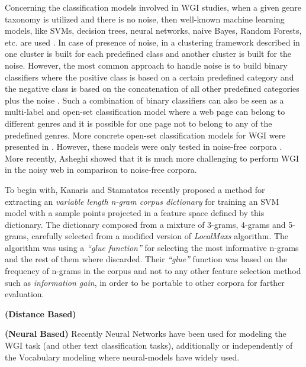 Concerning the classification models involved in WGI studies, when a given genre taxonomy is utilized and there is no noise, then well-known machine learning models, like SVMs, decision trees, neural networks, naive Bayes, Random Forests, etc. are used \parencite{Lim2005,santini2007automatic,kanaris2009learning,jebari2015combination,sharoff2010web}. In case of presence of  noise, in a clustering framework described in \parencite{kennedy2005automatic} one cluster is built for each predefined class and another cluster is built for the noise. However, the most  common approach to handle noise is to build binary classifiers where the positive class is based on a certain predefined category and the negative class is based on the concatenation of  all other predefined categories plus the noise \parencite{kennedy2005automatic,dong2006binary,levering2008using}. Such a combination of binary classifiers can also be seen as a multi-label  and open-set classification model where a web page can belong to different genres and it is possible for one page not to belong to any of the predefined genres. More concrete open-set  classification models for WGI were presented in \parencite{stubbe2007genre,pritsos2013open}. However, these models were only tested in noise-free corpora \parencite{pritsos2015clef}. More  recently, Asheghi \parencite{Asheghi2015} showed that it is much more challenging to perform WGI in the noisy web in comparison to noise-free corpora.

To begin with, Kanaris and Stamatatos \parencite{kanaris2009learning} recently proposed a method for extracting an \textit{variable length n-gram corpus dictionary} for training an SVM model with a sample points projected in a feature space defined by this dictionary. The dictionary composed from a mixture of 3-grams, 4-grams and 5-grams, carefully selected from a modified version of \textit{LocalMaxs }algorithm. The algorithm was using a \textit{``glue function''} for selecting the most informative n-grams and the rest of them where discarded. Their \textit{``glue''} function was based on the frequency of n-grams in the corpus and not to any other feature selection method such as \textit{information gain}, in order to be portable to other corpora for farther evaluation.  

\textbf{(Distance Based)}

\textbf{(Neural Based)}
Recently Neural Networks have been used for modeling the WGI task (and other text classification tasks), additionally or independently of the Vocabulary modeling where neural-models have widely used. 

